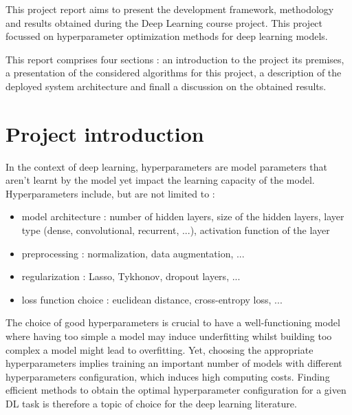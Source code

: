 \documentclass[a4 paper,11pt,2]{article}
\begin{document}


\tableofcontents
\newpage

This project report aims to present the development framework, methodology and
results obtained during the Deep Learning course project. This project focussed
on hyperparameter optimization methods for deep learning models.

This report comprises four sections : an introduction to the project its
premises, a presentation of the considered algorithms for this project, a
description of the deployed system architecture and finall a discussion on the
obtained results.

\section{Project introduction}
In the context of deep learning, hyperparameters are model parameters that
aren't learnt by the model yet impact the learning capacity of the model.
Hyperparameters include, but are not limited to :
\begin{itemize}
    \item model architecture : number of hidden layers, size of the hidden layers, layer
          type (dense, convolutional, recurrent, ...), activation function of the layer
    \item preprocessing : normalization, data augmentation, ...
    \item regularization : Lasso, Tykhonov, dropout layers, ...
    \item loss function choice : euclidean distance, cross-entropy loss, ...
\end{itemize}

The choice of good hyperparameters is crucial to have a well-functioning model
where having too simple a model may induce underfitting whilst building too
complex a model might lead to overfitting. Yet, choosing the appropriate
hyperparameters implies training an important number of models with different
hyperparameters configuration, which induces high computing costs. Finding
efficient methods to obtain the optimal hyperparameter configuration for a
given DL task is therefore a topic of choice for the deep learning literature.
\end{document}
